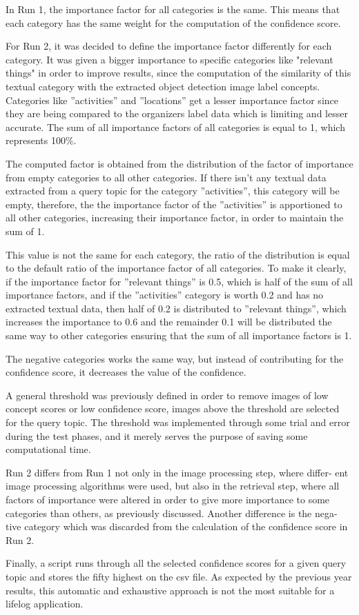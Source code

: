 In Run 1, the importance factor for all categories is the same. This means
that each category has the same weight for the computation of the confidence
score.

For Run 2, it was decided to define the importance factor differently for each category. It was given a bigger importance to specific categories like "relevant things" in order to improve results, since the computation of the similarity of this textual category with the extracted object detection image label concepts. Categories like
”activities” and ”locations” get a lesser importance factor since they are being
compared to the organizers label data which is limiting and lesser accurate. The
sum of all importance factors of all categories is equal to 1, which represents
100\%.

The computed factor is obtained from the distribution of the factor of importance from empty categories to all other categories. If there isn't any
textual data extracted from a query topic for the category ”activities”, this category will
be empty, therefore, the  the importance factor of the ”activities” is apportioned
 to all other categories, increasing their importance factor, in order to
maintain the sum of 1.

This value is not the same for each category, the ratio of the distribution is equal to the default ratio of the importance factor of all categories. To make it clearly, if the importance factor for ”relevant things” is 0.5, which is half of the sum of all importance factors, and
if the ”activities” category is worth 0.2 and has no extracted textual data, then
half of 0.2 is distributed to ”relevant things”, which increases the importance to
0.6 and the remainder 0.1 will be distributed the same way to other categories
ensuring that the sum of all importance factors is 1.

The negative categories works the same way, but instead of contributing for
the confidence score, it decreases the value of the confidence.

A general threshold was previously defined in order to remove images of low
concept scores or low confidence score, images above the threshold are selected
for the query topic. The threshold was implemented through some trial and
error during the test phases, and it merely serves the purpose of saving some
computational time.

Run 2 differs from Run 1 not only in the image processing step, where differ-
ent image processing algorithms were used, but also in the retrieval step, where
all factors of importance were altered in order to give more importance to some
categories than others, as previously discussed. Another difference is the nega-
tive category which was discarded from the calculation of the confidence score
in Run 2.

Finally, a script runs through all the selected confidence scores for a given
query topic and stores the fifty highest on the csv file. As expected by the
previous year results, this automatic and exhaustive approach is not the most
suitable for a lifelog application.


